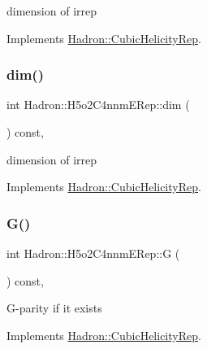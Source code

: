 dimension of irrep 

Implements \mbox{\hyperlink{structHadron_1_1CubicHelicityRep_a95d229a05580e65f8bdde74a1e316855}{Hadron\+::\+Cubic\+Helicity\+Rep}}.

\mbox{\label{structHadron_1_1H5o2C4nnmERep_accbf09b2922edd15ef55ad93a6d69777}} 
\subsubsection{\texorpdfstring{dim()}{dim()}\hspace{0.1cm}{\footnotesize\ttfamily [3/3]}}
{\footnotesize\ttfamily int Hadron\+::\+H5o2\+C4nnm\+E\+Rep\+::dim (\begin{DoxyParamCaption}{ }\end{DoxyParamCaption}) const\hspace{0.3cm}{\ttfamily [inline]}, {\ttfamily [virtual]}}

dimension of irrep 

Implements \mbox{\hyperlink{structHadron_1_1CubicHelicityRep_a95d229a05580e65f8bdde74a1e316855}{Hadron\+::\+Cubic\+Helicity\+Rep}}.

\mbox{\label{structHadron_1_1H5o2C4nnmERep_a4bfc67bc8a4c5f245f5e2917a2eaf51e}} 
\subsubsection{\texorpdfstring{G()}{G()}\hspace{0.1cm}{\footnotesize\ttfamily [1/3]}}
{\footnotesize\ttfamily int Hadron\+::\+H5o2\+C4nnm\+E\+Rep\+::G (\begin{DoxyParamCaption}{ }\end{DoxyParamCaption}) const\hspace{0.3cm}{\ttfamily [inline]}, {\ttfamily [virtual]}}

G-\/parity if it exists 

Implements \mbox{\hyperlink{structHadron_1_1CubicHelicityRep_a50689f42be1e6170aa8cf6ad0597018b}{Hadron\+::\+Cubic\+Helicity\+Rep}}.

\mbox{\label{structHadron_1_1H5o2C4nnmERep_a4bfc67bc8a4c5f245f5e2917a2eaf51e}} 
